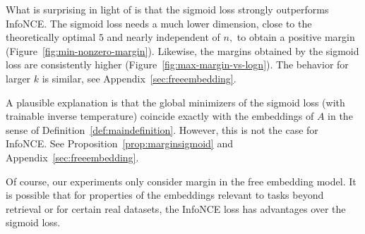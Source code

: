 \documentclass[preprint]{article}
\newtheorem{proposition}{Proposition}[]
\newcommand{\maxmargin}{\mathsf{m}^{rd}}
\newcommand{\ksparsen}{S_{n,k}}
\begin{document}
What is surprising in light of \cite{weller2025theoretical} is that the sigmoid loss strongly outperforms InfoNCE. The sigmoid loss needs a much lower dimension, close to the theoretically optimal $5$ and nearly independent of $n,$ to obtain a positive margin (Figure~\ref{fig:min-nonzero-margin}). Likewise, the margins obtained by the sigmoid loss are consistently higher  (Figure~\ref{fig:max-margin-vs-logn}). The behavior for larger $k$ is similar, see Appendix~\ref{sec:freeembedding}.

A plausible explanation is that the global minimizers of the sigmoid loss (with trainable inverse temperature) coincide exactly with the embeddings of $A$ in the sense of Definition~\ref{def:maindefinition}. However,  this is not the case for InfoNCE. See Proposition~\ref{prop:marginsigmoid} and Appendix~\ref{sec:freeembedding}.

Of course, our experiments only consider margin in the free embedding model. It is possible that for properties of the embeddings relevant to tasks beyond retrieval or for certain real datasets, the InfoNCE loss has advantages over the sigmoid loss. 






    



\end{document}
